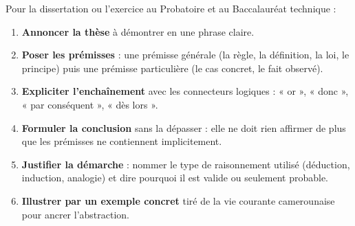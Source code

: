 \documentclass[11pt]{article}
\begin{document}
\begin{methode}
Pour la dissertation ou l'exercice au Probatoire et au Baccalauréat technique :
\begin{enumerate}
\item \textbf{Annoncer la thèse} à démontrer en une phrase claire.
\item \textbf{Poser les prémisses} : une prémisse générale (la règle, la définition, la loi, le principe) puis une prémisse particulière (le cas concret, le fait observé).
\item \textbf{Expliciter l'enchaînement} avec les connecteurs logiques : « or », « donc », « par conséquent », « dès lors ».
\item \textbf{Formuler la conclusion} sans la dépasser : elle ne doit rien affirmer de plus que les prémisses ne contiennent implicitement.
\item \textbf{Justifier la démarche} : nommer le type de raisonnement utilisé (déduction, induction, analogie) et dire pourquoi il est valide ou seulement probable.
\item \textbf{Illustrer par un exemple concret} tiré de la vie courante camerounaise pour ancrer l'abstraction.
\end{enumerate}
\end{methode}
\end{document}
